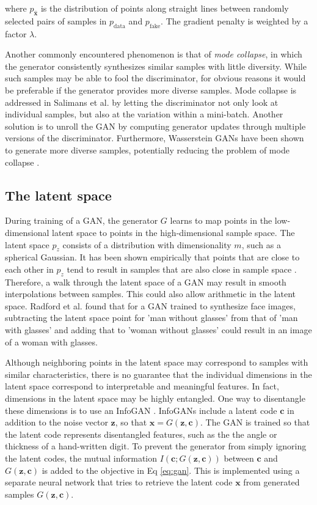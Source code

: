 \documentclass{article}
\begin{document}
where $p_{\hat{\mathbf{x}}}$ is the distribution of points along straight lines between randomly selected pairs of samples in $p_{\text{data}}$ and $p_{\text{fake}}$. The gradient penalty is weighted by a factor $\lambda$.


Another commonly encountered phenomenon is that of \textit{mode collapse}, in which the generator consistently synthesizes similar samples with little diversity. While such samples may be able to fool the discriminator, for obvious reasons it would be preferable if the generator provides more diverse samples. 
Mode collapse is addressed in Salimans et al. \cite{Sali16} by letting the discriminator not only look at individual samples, but also at the variation within a mini-batch. Another solution is to unroll the GAN \cite{Metz16} by computing generator updates through multiple versions of the discriminator. Furthermore, Wasserstein GANs have been shown to generate more diverse samples, potentially reducing the problem of mode collapse \cite{Arjo17}.

\subsection{The latent space}
During training of a GAN, the generator $G$ learns to map points in the low-dimensional latent space to points in the high-dimensional sample space. The latent space $p_z$ consists of a distribution with dimensionality $m$, such as a spherical Gaussian. It has been shown empirically that points that are close to each other in $p_z$ tend to result in samples that are also close in sample space \cite{Radf16}. 
Therefore, a walk through the latent space of a GAN may result in smooth interpolations between samples. This could also allow arithmetic in the latent space. Radford et al. \cite{Radf16} found that for a GAN trained to synthesize face images, subtracting the latent space point for 'man without glasses' from that of 'man with glasses' and adding that to 'woman without glasses' could result in an image of a woman with glasses.  

Although neighboring points in the latent space may correspond to samples with similar characteristics, there is no guarantee that the individual dimensions in the latent space correspond to interpretable and meaningful features. In fact, dimensions in the latent space may be highly entangled. One way to disentangle these dimensions is to use an InfoGAN \cite{Chen16}. InfoGANs include a latent code $\mathbf{c}$ in addition to the noise vector $\mathbf{z}$, so that $\mathbf{x} = G(\mathbf{z}, \mathbf{c})$. The GAN is trained so that the latent code represents disentangled features, such as the the angle or thickness of a hand-written digit. To prevent the generator from simply ignoring the latent codes, the mutual information $I(\mathbf{c};G(\mathbf{z}, \mathbf{c}))$ between $\mathbf{c}$ and $G(\mathbf{z}, \mathbf{c})$ is added to the objective in Eq \ref{eq:gan}. This is implemented using a separate neural network that tries to retrieve the latent code $\mathbf{x}$ from generated samples $G(\mathbf{z}, \mathbf{c})$. 
\end{document}
